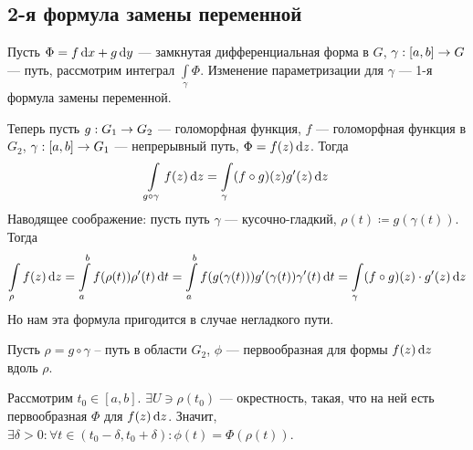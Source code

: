 \documentclass[a4paper]{report}
\begin{document}
    \subsection{2-я формула замены переменной}
    Пусть $\Phi = f \operatorname{d}\! x + g \operatorname{d}\! y$ --- замкнутая дифференциальная форма в $G$, $\gamma: [a, b] \rightarrow G$ --- путь, рассмотрим интеграл $\int\limits_{\gamma}\Phi$.
    Изменение параметризации для $\gamma$ --- 1-я формула замены переменной.

    Теперь пусть $g: G_1 \rightarrow G_2$ --- голоморфная функция, $f$ --- голоморфная функция в $G_2$, $\gamma: [a, b] \rightarrow G_1$ --- непрерывный путь, $\Phi = f(z)\operatorname{d}\! z$.
    Тогда
    \[\int\limits_{g \circ \gamma}f(z)\operatorname{d}\! z = \int\limits_{\gamma}(f \circ g)(z) g'(z)\operatorname{d}\! z\]
    Наводящее соображение: пусть путь $\gamma$ --- кусочно-гладкий, $\rho(t) \coloneqq g(\gamma(t))$.
    Тогда \[\int\limits_{\rho}f(z)\operatorname{d}\! z = \int\limits_{a}^{b}f(\rho(t))\rho'(t)\operatorname{d}\! t = \int\limits_{a}^{b}f(g(\gamma(t)))g'(\gamma(t))\gamma'(t)\operatorname{d}\! t = \int\limits_{\gamma}(f \circ g)(z)\cdot g'(z)\operatorname{d}\! z\]
    Но нам эта формула пригодится в случае негладкого пути.

    Пусть $\rho = g \circ \gamma$ -- путь в области $G_2$, $\phi$ --- первообразная для формы $f(z)\operatorname{d}\! z$ вдоль $\rho$.

    Рассмотрим $t_0 \in [a, b]$. $\exists U \ni \rho(t_0)$ --- окрестность, такая, что на ней есть первообразная $\Phi$ для $f(z)\operatorname{d}\! z$.
    Значит, $\exists \delta > 0: \forall t \in (t_0 - \delta, t_0 + \delta): \phi(t) = \Phi(\rho(t))$.
\end{document}
